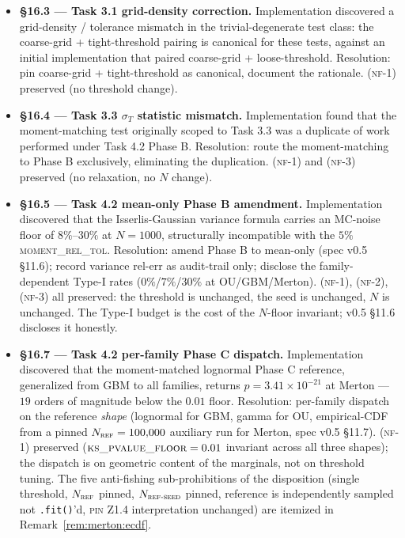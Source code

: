 \documentclass[11pt,letterpaper]{article}
\newcommand{\PinZ}[1]{\textsc{pin Z1.#1}}
\begin{document}
\begin{itemize}
    \item \textbf{\S16.3 — Task 3.1 grid-density correction.}
        Implementation discovered a grid-density / tolerance
        mismatch in the trivial-degenerate test class: the
        coarse-grid + tight-threshold pairing is canonical for these
        tests, against an initial implementation that paired
        coarse-grid + loose-threshold. Resolution: pin
        coarse-grid + tight-threshold as canonical, document the
        rationale. \textsc{(nf-1)} preserved (no threshold change).
    \item \textbf{\S16.4 — Task 3.3 $\sigma_{T}$ statistic mismatch.}
        Implementation found that the moment-matching test originally
        scoped to Task 3.3 was a duplicate of work performed under
        Task 4.2 Phase B. Resolution: route the moment-matching to
        Phase B exclusively, eliminating the duplication. \textsc{(nf-1)}
        and \textsc{(nf-3)} preserved (no relaxation, no $N$ change).
    \item \textbf{\S16.5 — Task 4.2 mean-only Phase B amendment.}
        Implementation discovered that the Isserlis-Gaussian variance
        formula carries an MC-noise floor of $8\%$--$30\%$ at
        $N = 1000$, structurally incompatible with the $5\%$
        \textsc{moment\_rel\_tol}. Resolution: amend Phase B to
        mean-only (spec v0.5 \S11.6); record variance rel-err as
        audit-trail only; disclose the family-dependent Type-I rates
        ($0\%$/$7\%$/$30\%$ at OU/GBM/Merton). \textsc{(nf-1)},
        \textsc{(nf-2)}, \textsc{(nf-3)} all preserved: the threshold
        is unchanged, the seed is unchanged, $N$ is unchanged. The
        Type-I budget is the cost of the $N$-floor invariant; v0.5
        \S11.6 discloses it honestly.
    \item \textbf{\S16.7 — Task 4.2 per-family Phase C dispatch.}
        Implementation discovered that the moment-matched lognormal
        Phase C reference, generalized from GBM to all families,
        returns $p = 3.41 \times 10^{-21}$ at Merton — $19$ orders of
        magnitude below the $0.01$ floor. Resolution: per-family
        dispatch on the reference \emph{shape} (lognormal for GBM,
        gamma for OU, empirical-CDF from a pinned
        $N_{\textsc{ref}} = 100{,}000$ auxiliary run for Merton, spec
        v0.5 \S11.7). \textsc{(nf-1)} preserved
        ($\textsc{ks\_pvalue\_floor} = 0.01$ invariant across all
        three shapes); the dispatch is on geometric content of the
        marginals, not on threshold tuning. The five anti-fishing
        sub-prohibitions of the disposition
        (single threshold, $N_{\textsc{ref}}$ pinned,
        $N_{\textsc{ref-seed}}$ pinned, reference is independently
        sampled not \texttt{.fit()}'d, \PinZ{4} interpretation
        unchanged) are itemized in Remark~\ref{rem:merton:ecdf}.
\end{itemize}
\end{document}
